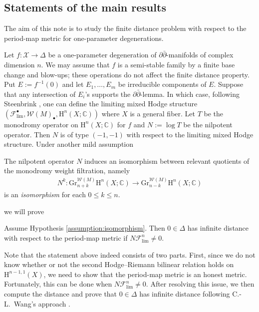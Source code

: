 \subsection{Statements of the main results}
The aim of this note is to study the finite distance problem 
with respect to the period-map metric for
one-parameter degenerations.

Let \(f\colon\mathcal{X}\to\Delta\) be a one-parameter degeneration of
\(\partial\bar{\partial}\)-manifolds of complex dimension \(n\).
We may assume that \(f\) is a semi-stable family by a finite base change and blow-ups;
these operations do not affect the finite distance property.
Put \(E:=f^{-1}(0)\) and let \(E_{1},\ldots,E_{m}\) be irreducible components of \(E\).
Suppose that any intersection of \(E_{i}\)'s supports the \(\partial\bar{\partial}\)-lemma.
In which case, 
following Steenbrink \cite{1975-Steenbrink-limits-of-hodge-structures}, one can define 
the limiting 
mixed Hodge structure \((\mathcal{F}^{\bullet}_{\mathrm{lim}},\mathcal{W}(M)_{\bullet},
\mathrm{H}^{n}(X;\mathbb{C}))\) where \(X\) is a general fiber. Let \(T\) be
the monodromy operator on \(\mathrm{H}^{n}(X;\mathbb{C})\) 
for \(f\) and \(N:=\log T\) be the nilpotent operator.
Then \(N\) is of type \((-1,-1)\) with respect to the limiting mixed Hodge structure.
Under another mild assumption
\begin{assumption}
\label{assumption:isomorphism}
The nilpotent operator \(N\) induces an isomorphism
between relevant quotients of
the monodromy weight filtration, namely
\begin{eqnarray*}
N^{k}\colon 
\mathrm{Gr}^{\mathcal{W}(M)}_{n+k}\mathrm{H}^{n}(X;\mathbb{C})\to 
\mathrm{Gr}^{\mathcal{W}(M)}_{n-k}\mathrm{H}^{n}(X;\mathbb{C})
\end{eqnarray*}
is an \emph{isomorphism} for each \(0\le k\le n\).
\end{assumption}
\noindent we will prove
\begin{theorem}[= Theorem \ref{thm_infinite-distance}]
Assume Hypothesis \ref{assumption:isomorphism}. Then
\(0\in\Delta\) has infinite distance with respect to the period-map metric
if \(N\mathcal{F}^{n}_{\mathrm{lim}}\ne 0\).
\end{theorem}
Note that the statement above indeed consists of two parts.
First, since 
we do not know whether or not the second Hodge--Riemann bilinear relation holds 
on \(\mathrm{H}^{n-1,1}(X)\), 
we need to show that the period-map metric is an honest metric. 
Fortunately, this can be done when 
\(N\mathcal{F}^{n}_{\mathrm{lim}}\ne 0\).
After resolving this issue, we then compute the distance and
prove that \(0\in\Delta\) has infinite
distance following C.-L.~Wang's approach
\cite{1997-Wang-on-the-incompleteness-of-the-weil-petersson-metric-along-degenerations-of-calabi-yau-manifolds}.

